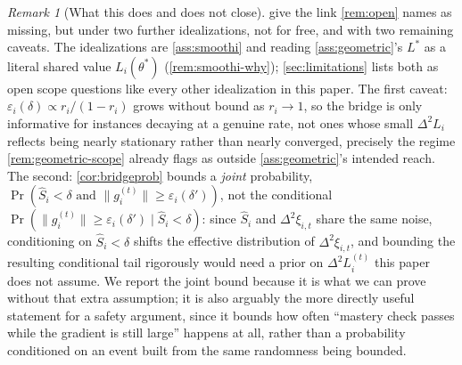 \documentclass{article}
\theoremstyle{plain}
\theoremstyle{definition}
\theoremstyle{remark}
\newtheorem{remark}[theorem]{Remark}
\begin{document}
\begin{remark}[What this does and does not close]
\label{rem:bridge-scope}
 give the link \cref{rem:open} names as missing, but under two further idealizations, not for free, and with two remaining caveats. The idealizations are \cref{ass:smoothi} and reading \cref{ass:geometric}'s $L^*$ as a literal shared value $L_i(\theta^*)$ (\cref{rem:smoothi-why}); \cref{sec:limitations} lists both as open scope questions like every other idealization in this paper. The first caveat: $\varepsilon_i(\delta)\propto r_i/(1-r_i)$ grows without bound as $r_i\to1$, so the bridge is only informative for instances decaying at a genuine rate, not ones whose small $\Delta^2 L_i$ reflects being nearly stationary rather than nearly converged, precisely the regime \cref{rem:geometric-scope} already flags as outside \cref{ass:geometric}'s intended reach. The second: \cref{cor:bridgeprob} bounds a \emph{joint} probability, $\Pr(\hat S_i<\delta\text{ and }\|g_i^{(t)}\|\ge\varepsilon_i(\delta'))$, not the conditional $\Pr(\|g_i^{(t)}\|\ge\varepsilon_i(\delta')\mid \hat S_i<\delta)$: since $\hat S_i$ and $\Delta^2\xi_{i,t}$ share the same noise, conditioning on $\hat S_i<\delta$ shifts the effective distribution of $\Delta^2\xi_{i,t}$, and bounding the resulting conditional tail rigorously would need a prior on $\Delta^2 L_i^{(t)}$ this paper does not assume. We report the joint bound because it is what we can prove without that extra assumption; it is also arguably the more directly useful statement for a safety argument, since it bounds how often ``mastery check passes while the gradient is still large'' happens at all, rather than a probability conditioned on an event built from the same randomness being bounded.
\end{remark}
\end{document}
